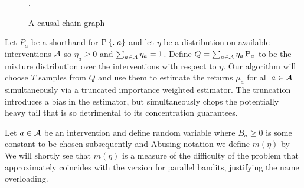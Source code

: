 
\begin{figure}[h]
\centering
{}
\caption{A causal chain graph}.
\label{fig:causalchain}
\end{figure} 

Let $P_a$ be a shorthand for $\P{.|a}$ and let $\eta$ be a distribution on available interventions $\calA$ so $\eta_a \geq 0$ and $\sum_{a \in \calA} \eta_a = 1$.
Define $Q = \sum_{a \in \calA} \eta_a \Ps_a$ to be the mixture distribution over the interventions with respect to $\eta$.
Our algorithm will choose $T$ samples from $Q$ and use them to estimate the returns $\mu_a$ for all $a \in \calA$ simultaneously via
a truncated importance weighted estimator. The truncation introduces a bias in the estimator, but simultaneously chops the potentially heavy tail
that is so detrimental to its concentration guarantees. 

Let $a \in \calA$ be an intervention and define random variable
where $B_a \geq 0$ is some constant to be chosen subsequently and
Abusing notation we define $m(\eta)$ by
We will shortly see that $m(\eta)$ is a measure of the difficulty of the problem that approximately 
coincides with the version for parallel bandits, justifying the name overloading.

